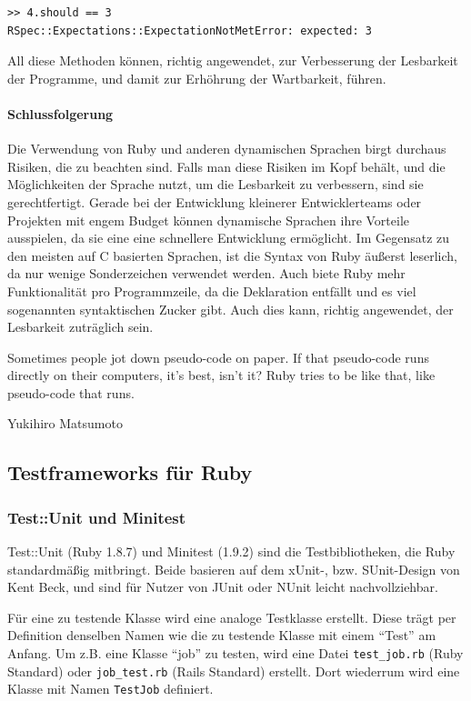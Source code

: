 \begin{lstlisting}
>> 4.should == 3
RSpec::Expectations::ExpectationNotMetError: expected: 3
\end{lstlisting}

All diese Methoden können, richtig angewendet, zur Verbesserung der Lesbarkeit der Programme, und damit zur Erhöhrung der Wartbarkeit, führen.

\paragraph{Schlussfolgerung}

Die Verwendung von Ruby und anderen dynamischen Sprachen birgt durchaus Risiken, die zu beachten sind. Falls man diese Risiken im Kopf behält, und die Möglichkeiten der Sprache nutzt, um die Lesbarkeit zu verbessern, sind sie gerechtfertigt. Gerade bei der Entwicklung kleinerer Entwicklerteams oder Projekten mit engem Budget können dynamische Sprachen ihre Vorteile ausspielen, da sie eine eine schnellere Entwicklung ermöglicht. Im Gegensatz zu den meisten auf C basierten Sprachen, ist die Syntax von Ruby äußerst leserlich, da nur wenige Sonderzeichen verwendet werden. Auch biete Ruby mehr Funktionalität pro Programmzeile, da die Deklaration entfällt und es viel sogenannten syntaktischen Zucker gibt. Auch dies kann, richtig angewendet, der Lesbarkeit zuträglich sein.
\epigraph{Sometimes people jot down pseudo-code on paper. If that pseudo-code runs directly on their computers, it's best, isn't it? Ruby tries to be like that, like pseudo-code that runs. }{Yukihiro Matsumoto}


\subsection{Testframeworks für Ruby}
\subsubsection{Test::Unit und Minitest}
Test::Unit (Ruby 1.8.7) und Minitest (1.9.2) sind die Testbibliotheken, die Ruby standardmäßig mitbringt. Beide basieren auf dem xUnit-, bzw. SUnit-Design von Kent Beck, und sind für Nutzer von JUnit oder NUnit leicht nachvollziehbar. %

Für eine zu testende Klasse wird eine analoge Testklasse erstellt. Diese trägt per Definition denselben Namen wie die zu testende Klasse mit einem "`Test"' am Anfang. Um z.B. eine Klasse "`job"' zu testen, wird eine Datei \texttt{test\_job.rb} (Ruby Standard) oder \texttt{job\_test.rb} (Rails Standard) erstellt. Dort wiederrum wird eine Klasse mit Namen \texttt{TestJob} definiert. 

